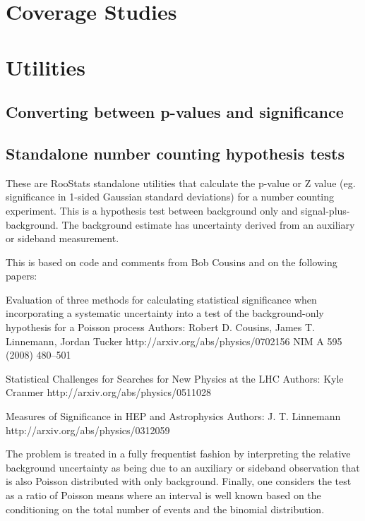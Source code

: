 \documentclass[11pt]{article}
\begin{document}
\section{Coverage Studies}

\section{Utilities}


\subsection{Converting between p-values and significance}


\subsection{Standalone number counting hypothesis tests}
These are  RooStats standalone utilities
that calculate the p-value or Z value (eg. significance in
1-sided Gaussian standard deviations) for a number counting experiment.
This is a hypothesis test between background only and signal-plus-background.
The background estimate has uncertainty derived from an auxiliary or sideband
measurement.

This is based on code and comments from Bob Cousins 
and on the following papers:

Evaluation of three methods for calculating statistical significance when incorporating a systematic uncertainty into a test of the background-only hypothesis for a Poisson process
Authors: Robert D. Cousins, James T. Linnemann, Jordan Tucker
http://arxiv.org/abs/physics/0702156
NIM  A 595 (2008) 480--501

Statistical Challenges for Searches for New Physics at the LHC
Authors: Kyle Cranmer
http://arxiv.org/abs/physics/0511028

 Measures of Significance in HEP and Astrophysics
 Authors: J. T. Linnemann
 http://arxiv.org/abs/physics/0312059

The problem is treated in a fully frequentist fashion by 
interpreting the relative background uncertainty as
being due to an auxiliary or sideband observation 
that is also Poisson distributed with only background.
Finally, one considers the test as a ratio of Poisson means
where an interval is well known based on the conditioning on the total
number of events and the binomial distribution.
\end{document}
